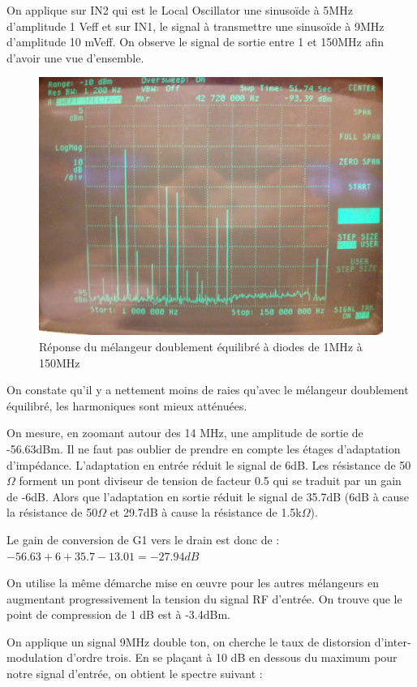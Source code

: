 \documentclass{article}
\begin{document}
On applique sur IN2 qui est le Local Oscillator une sinusoïde à 5MHz d'amplitude  1 Veff  et sur IN1, le signal à transmettre une sinusoïde à 9MHz d'amplitude 10 mVeff.
On observe le signal de sortie entre 1 et 150MHz afin d'avoir une vue d'ensemble.
\begin{figure}[h!]
	\centering
	\includegraphics[width=.7\textwidth]{10_3_1}
	\caption{Réponse du mélangeur doublement équilibré à diodes de 1MHz à 150MHz}
	\label{fig:10_3_1}
\end{figure}

On constate qu'il y a nettement moins de raies qu'avec le mélangeur doublement équilibré, les harmoniques sont mieux atténuées.


On mesure, en zoomant autour des 14 MHz, une amplitude de sortie de -56.63dBm.
Il ne faut pas oublier de prendre en compte les étages d'adaptation d'impédance. L'adaptation en entrée réduit le signal de 6dB. Les résistance de 50$\Omega$ forment un pont diviseur de tension de facteur 0.5 qui se traduit par un gain de -6dB.
Alors que l'adaptation en sortie réduit le signal de 35.7dB (6dB à cause la résistance de 50$\Omega$ et 29.7dB à cause la résistance de 1.5k$\Omega$).

Le gain de conversion de G1 vers le drain est donc de : $-56.63+6+35.7-13.01= -27.94 dB$


On utilise la même démarche mise en œuvre pour les autres mélangeurs en augmentant progressivement la tension du signal RF d'entrée.
On trouve que le point de compression de 1 dB est à -3.4dBm.


On applique un signal 9MHz double ton, on cherche le taux de distorsion d'inter-modulation d'ordre trois.
En se plaçant à 10 dB en dessous du maximum pour notre signal d'entrée, on obtient le spectre suivant :
\end{document}
